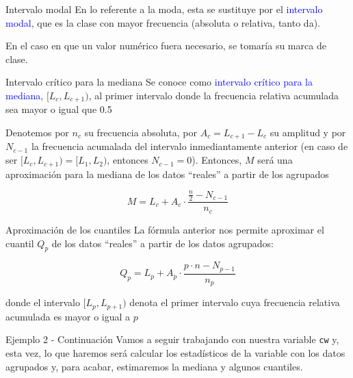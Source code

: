 \documentclass[
  ignorenonframetext,
  aspectratio=169]{beamer}
\newcommand\blue[1]{\textcolor{blue}{#1}}
\begin{document}
\begin{frame}{Intervalo modal}
\label{intervalo-modal}
En lo referente a la moda, esta se sustituye por el
\blue{intervalo modal}, que es la clase con mayor frecuencia (absoluta o
relativa, tanto da).

En el caso en que un valor numérico fuera necesario, se tomaría su marca
de clase.
\end{frame}

\begin{frame}{Intervalo crítico para la mediana}
\label{intervalo-cruxedtico-para-la-mediana}
Se conoce como \blue{intervalo crítico para la mediana},
\([L_c,L_{c+1})\), al primer intervalo donde la frecuencia relativa
acumulada sea mayor o igual que 0.5

Denotemos por \(n_c\) su frecuencia absoluta, por \(A_c = L_{c+1}-L_c\)
su amplitud y por \(N_{c-1}\) la frecuencia acumalada del intervalo
inmediantamente anterior (en caso de ser \([L_c,L_{c+1})=[L_1,L_2)\),
entonces \(N_{c-1}=0\)). Entonces, \(M\) será una aproximación para la
mediana de los datos ``reales'' a partir de los agrupados

\[M = L_c +A_c\cdot\frac{\frac{n}{2}-N_{c-1}}{n_c}\]
\end{frame}

\begin{frame}{Aproximación de los cuantiles}
\label{aproximaciuxf3n-de-los-cuantiles}
La fórmula anterior nos permite aproximar el cuantil \(Q_p\) de los
datos ``reales'' a partir de los datos agrupados:

\[Q_p = L_p +A_p\cdot\frac{p\cdot n-N_{p-1}}{n_p}\]

donde el intervalo \([L_p,L_{p+1})\) denota el primer intervalo cuya
frecuencia relativa acumulada es mayor o igual a \(p\)
\end{frame}

\begin{frame}[fragile]{Ejemplo 2 - Continuación}
\label{ejemplo-2---continuaciuxf3n}
Vamos a seguir trabajando con nuestra variable \texttt{cw} y, esta vez,
lo que haremos será calcular los estadísticos de la variable con los
datos agrupados y, para acabar, estimaremos la mediana y algunos
cuantiles.
\end{frame}
\end{document}
